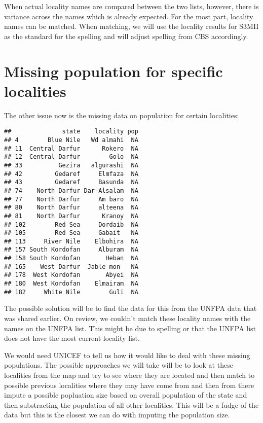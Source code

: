 \documentclass[12pt,a4paper]{article}
\begin{document}
When actual locality names are compared between the two lists, however, there is variance across the names which is already expected. For the most part, locality names can be matched. When matching, we will use the locality results for S3MII as the standard for the spelling and will adjust spelling from CBS accordingly.

\newpage

\hypertarget{missing-population-for-specific-localities}{%
\section{Missing population for specific localities}\label{missing-population-for-specific-localities}}

The other issue now is the missing data on population for certain localities:

\begin{verbatim}
##              state    locality pop
## 4        Blue Nile   Wd almahi  NA
## 11  Central Darfur      Rokero  NA
## 12  Central Darfur        Golo  NA
## 33          Gezira   algurashi  NA
## 42         Gedaref     Elmfaza  NA
## 43         Gedaref     Basunda  NA
## 74    North Darfur Dar-Alsalam  NA
## 77    North Darfur     Am baro  NA
## 80    North Darfur     alteena  NA
## 81    North Darfur      Kranoy  NA
## 102        Red Sea     Dordaib  NA
## 105        Red Sea     Gabait   NA
## 113     River Nile    Elbohira  NA
## 157 South Kordofan     Alburam  NA
## 158 South Kordofan       Heban  NA
## 165    West Darfur  Jable mon   NA
## 178  West Kordofan       Abyei  NA
## 180  West Kordofan    Elmairam  NA
## 182     White Nile        Guli  NA
\end{verbatim}

The possible solution will be to find the data for this from the UNFPA data that was shared earlier. On review, we couldn't match these locality names with the names on the UNFPA list. This might be due to spelling or that the UNFPA list does not have the most current locality list.

We would need UNICEF to tell us how it would like to deal with these missing populations. The possible approaches we will take will be to look at these localities from the map and try to see where they are located and then match to possible previous localities where they may have come from and then from there impute a possible popluation size based on overall population of the state and then substracting the population of all other localities. This will be a fudge of the data but this is the closest we can do with imputing the population size.
\end{document}
